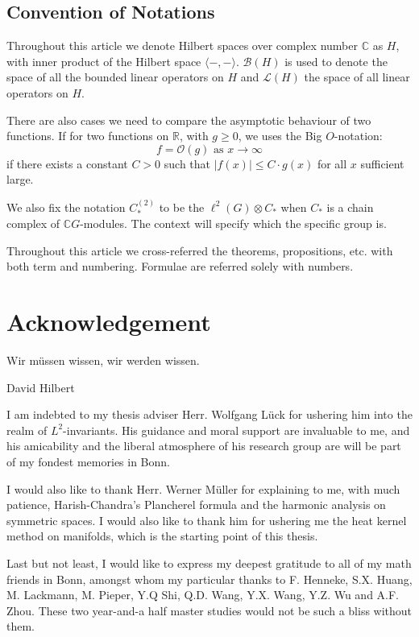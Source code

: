 \documentclass[11pt]{report}
\theoremstyle{definition}
\theoremstyle{plain}
\newcommand{\real}{\mathbb{R}}
\newcommand{\complex}{\mathbb{C}}
\newcommand{\bdd}{\mathcal{B}}
\newcommand{\brac}[1]{\langle #1 \rangle}
\begin{document}
	\section*{Convention of Notations}
	Throughout this article we denote Hilbert spaces over complex number $\complex$ as $H$, with inner product of the Hilbert space $\brac{-,-}$. $\bdd(H)$ is used to denote the space of all the bounded linear operators on $H$ and $\mathcal{L}(H)$ the space of all linear operators on $H$. 
	\par There are also cases we need to compare the asymptotic behaviour of two functions. If for two functions on $\real$, with $g\geq 0$, we uses the Big $O$-notation:
	\begin{equation*}
	f=\mathcal{O}(g) \text{ as }x\to \infty
	\end{equation*}
	if there exists a constant $C>0$ such that $|f(x)|\leq C\cdot g(x)$ for all $x$ sufficient large. 
	\par We also fix the notation $C_*^{(2)}$ to be the $\ell^2(G)\otimes C_*$ when $C_*$ is a chain complex of $\complex G$-modules. The context will specify which the specific group is.
	\par Throughout this article we cross-referred the theorems, propositions, etc. with both term and numbering. Formulae are referred solely with numbers.
	
	
\chapter*{Acknowledgement}
\epigraph{Wir m\"ussen wissen, wir werden wissen.}{David Hilbert}
\par I am indebted to my thesis adviser Herr. Wolfgang L\"uck for ushering him into the realm of $L^2$-invariants. His guidance and moral support are invaluable to me, and his amicability and the liberal atmosphere of his research group are will be part of my fondest memories in Bonn.
\par I would also like to thank Herr. Werner M\"uller for explaining to me, with much patience, Harish-Chandra's Plancherel formula and the harmonic analysis on symmetric spaces. I would also like to thank him for ushering me the heat kernel method on manifolds, which is the starting point of this thesis.
\par Last but not least, I would like to express my deepest gratitude to all of my math friends in Bonn, amongst whom my particular thanks to F. Henneke, S.X. Huang, M. Lackmann, M. Pieper, Y.Q Shi, Q.D. Wang, Y.X. Wang, Y.Z. Wu and A.F. Zhou. These two year-and-a half master studies would not be such a bliss without them.
\end{document}
